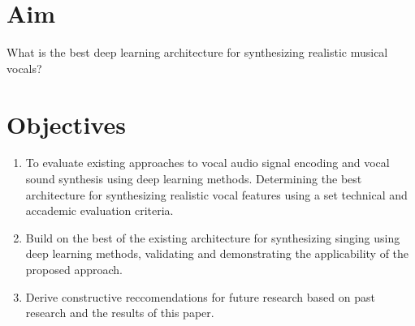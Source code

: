 \section{Aim}

What is the best deep learning architecture for synthesizing realistic musical vocals?

\section{Objectives}

\begin{enumerate}
    \item To evaluate existing approaches to vocal audio signal encoding and vocal sound synthesis using deep learning methods. Determining the best architecture for synthesizing realistic vocal features using a set technical and accademic evaluation criteria.
    \item Build on the best of the existing architecture for synthesizing singing using deep learning methods, validating and demonstrating the applicability of the proposed approach.
    \item Derive constructive reccomendations for future research based on past research and the results of this paper.
\end{enumerate}